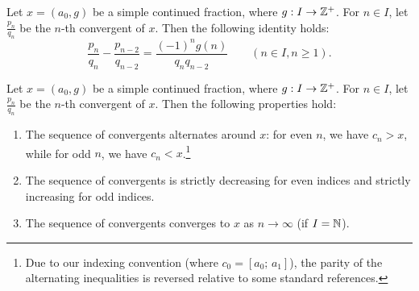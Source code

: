 \begin{corollary}
    Let $x = (a_0, g)$ be a simple continued fraction, where $g: I \to \mathbb{Z}^+$. 
    For $n \in I$, let $\frac{p_n}{q_n}$ be the $n$-th convergent of $x$. Then the following identity holds:
    \[
        \frac{p_n}{q_n} - \frac{p_{n-2}}{q_{n-2}} = \frac{(-1)^n g(n)}{q_n q_{n-2}} \qquad (n \in I, n \geq 1).
    \]
\end{corollary}

\begin{theorem}
    Let $x = (a_0, g)$ be a simple continued fraction, where $g: I \to \mathbb{Z}^+$. 
    For $n \in I$, let $\frac{p_n}{q_n}$ be the $n$-th convergent of $x$. Then the following properties hold:
    \begin{enumerate}
        \item The sequence of convergents alternates around $x$: for even $n$, we have $c_n > x$, while for odd $n$, we have $c_n < x$.\footnote{
            Due to our indexing convention (where $c_0 = [a_0;\, a_1]$), the parity of the alternating
            inequalities is reversed relative to some standard references.
        }   
        \item The sequence of convergents is strictly decreasing for even indices and strictly increasing for odd indices.
        \item The sequence of convergents converges to $x$ as $n \to \infty$ (if $I = \mathbb{N}$).
    \end{enumerate}
\end{theorem}

